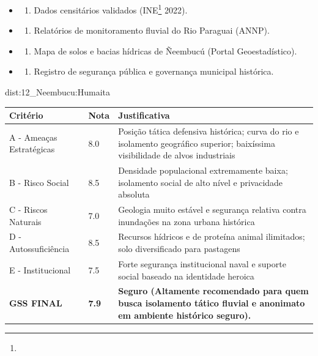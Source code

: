 {\begin{itemize}
\tightlist
\item
  \begin{enumerate}
  \def\labelenumi{\arabic{enumi})}
  \tightlist
  \item
    Dados censitários validados (INE\footnote{\fineINE} 2022).
  \end{enumerate}
\item
  \begin{enumerate}
  \def\labelenumi{\arabic{enumi})}
  \setcounter{enumi}{1}
  \tightlist
  \item
    Relatórios de monitoramento fluvial do Rio Paraguai (ANNP).
  \end{enumerate}
\item
  \begin{enumerate}
  \def\labelenumi{\arabic{enumi})}
  \setcounter{enumi}{2}
  \tightlist
  \item
    Mapa de solos e bacias hídricas de Ñeembucú (Portal Geoestadístico).
  \end{enumerate}
\item
  \begin{enumerate}
  \def\labelenumi{\arabic{enumi})}
  \setcounter{enumi}{3}
  \tightlist
  \item
    Registro de segurança pública e governança municipal histórica.
  \end{enumerate}
\end{itemize}}{dist:12_Neembucu:Humaita}
\begin{table}[ht!]
\small \begin{tabular}{p{3.0cm}p{0.8cm}p{6.0cm}} \toprule
\textbf{Critério} & \textbf{Nota} & \textbf{Justificativa} \\ \midrule
A - Ameaças Estratégicas & 8.0 & Posição tática defensiva histórica; curva do rio e isolamento geográfico superior; baixíssima visibilidade de alvos industriais \\
B - Risco Social & 8.5 & Densidade populacional extremamente baixa; isolamento social de alto nível e privacidade absoluta \\
C - Riscos Naturais & 7.0 & Geologia muito estável e segurança relativa contra inundações na zona urbana histórica \\
D - Autossuficiência & 8.5 & Recursos hídricos e de proteína animal ilimitados; solo diversificado para pastagens \\
E - Institucional & 7.5 & Forte segurança institucional naval e suporte social baseado na identidade heroica \\
\midrule \textbf{GSS FINAL} & \textbf{7.9} & \textbf{Seguro (Altamente recomendado para quem busca isolamento tático fluvial e anonimato em ambiente histórico seguro).} \\ \bottomrule \end{tabular}
\end{table}
